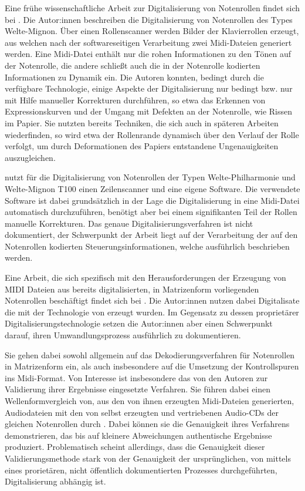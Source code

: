 Eine frühe wissenschaftliche Arbeit zur Digitalisierung von Notenrollen findet sich bei \textcite[]{zoltan_1994}.
Die Autor:innen beschreiben die Digitalisierung von Notenrollen des Types Welte-Mignon.
Über einen Rollenscanner werden Bilder der Klavierrollen erzeugt, aus welchen nach der softwareseitigen Verarbeitung zwei Midi-Dateien generiert werden.
Eine Midi-Datei enthält nur die rohen Informationen zu den Tönen auf der Notenrolle, die andere schließt auch die in der Notenrolle kodierten Informationen zu Dynamik ein.
Die Autoren konnten, bedingt durch die verfügbare Technologie, einige Aspekte der Digitalisierung nur bedingt bzw. nur mit Hilfe manueller Korrekturen durchführen, so etwa das Erkennen von Expressionskurven und der Umgang mit Defekten an der Notenrolle, wie Rissen im Papier.
Sie nutzten bereits Techniken, die sich auch in späteren Arbeiten wiederfinden, so wird etwa der Rollenrande dynamisch über den Verlauf der Rolle verfolgt, um durch Deformationen des Papiers entstandene Ungenauigkeiten auszugleichen.

\textcite[]{debrunner_201300} nutzt für die Digitalisierung von Notenrollen der Typen Welte-Philharmonie und Welte-Mignon T100 einen Zeilenscanner und eine eigene Software.
Die verwendete Software ist dabei grundsätzlich in der Lage die Digitalisierung in eine Midi-Datei automatisch durchzuführen, benötigt aber bei einem signifikanten Teil der Rollen manuelle Korrekturen.
Das genaue Digitalisierungsverfahren ist nicht dokumentiert, der Schwerpunkt der Arbeit liegt auf der Verarbeitung der auf den Notenrollen kodierten Steuerungsinformationen, welche ausführlich beschrieben werden.

Eine Arbeit, die sich spezifisch mit den Herausforderungen der Erzeugung von MIDI Dateien aus bereits digitalisierten, in Matrizenform vorliegenden Notenrollen beschäftigt findet sich bei \textcite[]{colmenares_2011}.
Die Autor:innen nutzen dabei Digitalisate die mit der Technologie von \textcite[]{stahnke_1996} erzeugt wurden.
Im Gegensatz zu dessen proprietärer Digitalisierungstechnologie setzen die Autor:innen aber einen Schwerpunkt darauf, ihren Umwandlungsprozess ausführlich zu dokumentieren.

Sie gehen dabei sowohl allgemein auf das Dekodierungsverfahren für Notenrollen in Matrizenform ein, als auch insbesondere auf die Umsetzung der Kontrollspuren ins Midi-Format.
Von Interesse ist insbesondere das von den Autoren zur Validierung ihrer Ergebnisse eingesetzte Verfahren.
Sie führen dabei einen Wellenformvergleich von, aus den von ihnen erzeugten Midi-Dateien generierten, Audiodateien mit den von \textcite[]{stahnke_1996} selbst erzeugten und vertriebenen Audio-CDs der gleichen Notenrollen durch \parencite[70-72]{colmenares_2011}.
Dabei können sie die Genauigkeit ihres Verfahrens demonstrieren, das bis auf kleinere Abweichungen authentische Ergebnisse produziert.
Problematisch scheint allerdings, dass die Genauigkeit dieser Validierungsmethode stark von der Genauigkeit der ursprünglichen, von \textcite[]{stahnke_1996} mittels eines prorietären, nicht öffentlich dokumentierten Prozesses durchgeführten, Digitalisierung abhängig ist.

